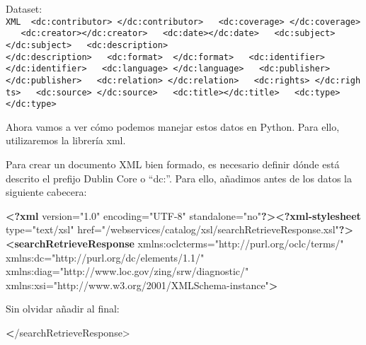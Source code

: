 \documentclass[11pt]{article}
\newenvironment{Shaded}{}{}
\newcommand{\KeywordTok}[1]{\textcolor[rgb]{0.00,0.44,0.13}{\textbf{{#1}}}}
\newcommand{\StringTok}[1]{\textcolor[rgb]{0.25,0.44,0.63}{{#1}}}
\newcommand{\OtherTok}[1]{\textcolor[rgb]{0.00,0.44,0.13}{{#1}}}
\newcommand{\ErrorTok}[1]{\textcolor[rgb]{1.00,0.00,0.00}{\textbf{{#1}}}}
\newcommand{\NormalTok}[1]{{#1}}
\begin{document}
Dataset:
\texttt{XML\ \ \textless{}dc:contributor\textgreater{}\ \textless{}/dc:contributor\textgreater{}\ \ \ \textless{}dc:coverage\textgreater{}\ \textless{}/dc:coverage\textgreater{}\ \ \ \textless{}dc:creator\textgreater{}\textless{}/dc:creator\textgreater{}\ \ \ \textless{}dc:date\textgreater{}\textless{}/dc:date\textgreater{}\ \ \ \textless{}dc:subject\textgreater{}\textless{}/dc:subject\textgreater{}\ \ \ \textless{}dc:description\textgreater{}\textless{}/dc:description\textgreater{}\ \ \ \textless{}dc:format\textgreater{}\ \ \textless{}/dc:format\textgreater{}\ \ \ \textless{}dc:identifier\textgreater{}\textless{}/dc:identifier\textgreater{}\ \ \ \textless{}dc:language\textgreater{}\ \textless{}/dc:language\textgreater{}\ \ \ \textless{}dc:publisher\textgreater{}\textless{}/dc:publisher\textgreater{}\ \ \ \textless{}dc:relation\textgreater{}\ \textless{}/dc:relation\textgreater{}\ \ \ \textless{}dc:rights\textgreater{}\ \textless{}/dc:rights\textgreater{}\ \ \ \textless{}dc:source\textgreater{}\ \textless{}/dc:source\textgreater{}\ \ \ \textless{}dc:title\textgreater{}\textless{}/dc:title\textgreater{}\ \ \ \textless{}dc:type\textgreater{}\textless{}/dc:type\textgreater{}}

    Ahora vamos a ver cómo podemos manejar estos datos en Python. Para ello,
utilizaremos la librería xml.

Para crear un documento XML bien formado, es necesario definir dónde
está descrito el prefijo Dublin Core o ``dc:''. Para ello, añadimos
antes de los datos la siguiente cabecera:

\begin{Shaded}
\begin{Highlighting}[]
\KeywordTok{<?xml}\NormalTok{ version="1.0" encoding="UTF-8" standalone="no"}\KeywordTok{?><?xml-stylesheet}\NormalTok{ type="text/xsl" href="/webservices/catalog/xsl/searchRetrieveResponse.xsl"}\KeywordTok{?>}
\KeywordTok{<searchRetrieveResponse}\OtherTok{ xmlns:oclcterms=}\StringTok{"http://purl.org/oclc/terms/"}\OtherTok{ xmlns:dc=}\StringTok{"http://purl.org/dc/elements/1.1/"}\OtherTok{ xmlns:diag=}\StringTok{"http://www.loc.gov/zing/srw/diagnostic/"}\OtherTok{ xmlns:xsi=}\StringTok{"http://www.w3.org/2001/XMLSchema-instance"}\KeywordTok{>}
\end{Highlighting}
\end{Shaded}

Sin olvidar añadir al final:

\begin{Shaded}
\begin{Highlighting}[]
\ErrorTok{<}\NormalTok{/searchRetrieveResponse>}
\end{Highlighting}
\end{Shaded}
\end{document}
